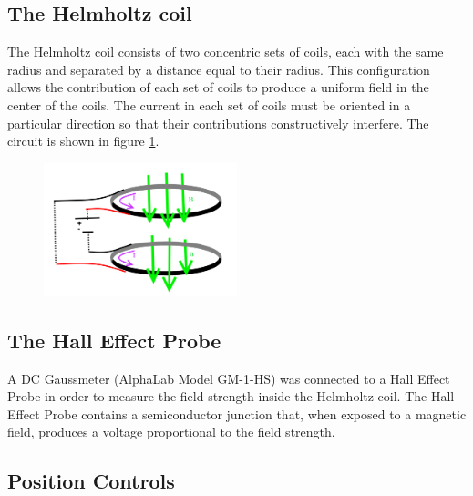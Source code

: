 \documentclass[a4paper]{article}
\begin{document}
\subsection{The Helmholtz coil}


\qq The Helmholtz coil consists of two concentric sets of coils, each with the same
radius and separated by a distance equal to their radius. This configuration
allows the contribution of each set of coils to produce a uniform field in the
center of the coils. The current in each set of coils must be oriented in a
particular direction so that their contributions constructively interfere. The
circuit is shown in figure \ref{helmholtz_circuit}.

\begin{figure}[H]
\centering
\includegraphics[width=0.5\textwidth]{circuit.png}


\label{helmholtz_circuit}
\end{figure}

\subsection{The Hall Effect Probe}


\qq A DC Gaussmeter (AlphaLab Model GM-1-HS) was connected to a Hall Effect Probe in
order to measure the field strength inside the Helmholtz coil. The Hall Effect
Probe contains a semiconductor junction that, when exposed to a magnetic field,
produces a voltage proportional to the field strength.


\subsection{Position Controls}
\end{document}
